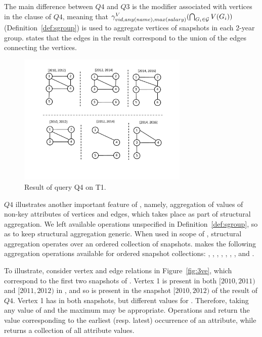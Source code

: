 The main difference between $Q4$ and $Q3$ is the  modifier
associated with vertices in the  clause of $Q4$,
meaning that $\gamma^{V}_{vid, any(name), max(salary)}(\bigcap_{G_i
  \in {\cal G}} V(G_i))$ (Definition~\ref{def:sgroup}) is used to
aggregate vertices of snapshots in each 2-year group.  
states that the edges in the result correspond to the union of the
edges connecting the vertices.

\begin{figure}
\includegraphics[width=3.2in]{figs/TGroupAllAny.pdf}
\caption{Result of query Q4 on T1.}
\label{fig:tg_all_any}
\end{figure}

$Q4$ illustrates another important feature of \ql, namely, aggregation
of values of non-key attributes of vertices and edges, which takes
place as part of structural aggregation.  We left available operations
unspecified in Definition~\ref{def:sgroup}, so as to keep structural
aggregation generic.
%
When used in scope of , structural aggregation operates
over an ordered collection of snapshots.  \ql makes the following
aggregation operations available for ordered snapshot collections:
, , , , ,
, , and .

To illustrate, consider vertex and edge relations in
Figure~\ref{fig:3ve}, which correspond to the first two snapshots of
.  Vertex 1 is present in both $[2010, 2011)$ and $[2011,
    2012)$ in , and so is present in the snapshot $[2010,
      2012)$ of the result of $Q4$.  Vertex 1 has 
      in both snapshots, but different values for .
      Therefore, taking any value of  and the maximum
       may be appropriate.  Operations  and
       return the value corresponding to the earliest
      (resp. latest) occurrence of an attribute, while 
      returns a collection of all attribute values.

